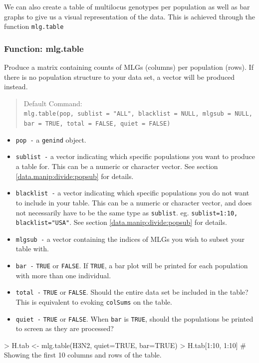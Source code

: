 \documentclass[letterpaper]{article}
\newcommand{\tab}{\hspace*{1em}}
\begin{document}
We can also create a table of multilocus genotypes per population as well as bar graphs to give us a visual representation of the data. This is achieved through the function \texttt{mlg.table}
\subsubsection{Function: mlg.table}\label{mlg:table:mlg.table}

\tab\tab Produce a matrix containing counts of MLGs (columns) per population (rows). If there is no population structure to your data set, a vector will be produced instead.
\begin{quote}
Default Command:\\
\texttt{mlg.table(pop, sublist = "ALL", blacklist = NULL, mlgsub = NULL, bar = TRUE, total = FALSE, quiet = FALSE)}
\end{quote}
  \begin{itemize}
    \item \texttt{pop -} a \texttt{genind} object.
    \item \texttt{sublist -} a vector indicating which specific populations you want to produce a table for. This can be a numeric or character vector. See section \ref{data.manip:divide:popsub} for details.
    \item \texttt{blacklist -} a vector indicating which specific populations you do not want to include in your table. This can be a numeric or character vector, and does not necessarily have to be the same type as \texttt{sublist}. eg. \texttt{sublist=1:10, blacklist="USA"}. See section \ref{data.manip:divide:popsub} for details.
    \item \texttt{mlgsub -} a vector containing the indices of MLGs you wish to subset your table with. 
    \item \texttt{bar -} \texttt{TRUE} or \texttt{FALSE}. If  \texttt{TRUE}, a bar plot will be printed for each population with more than one individual. 
    \item \texttt{total -} \texttt{TRUE} or \texttt{FALSE}. Should the entire data set be included in the table? This is equivalent to evoking \texttt{colSums} on the table.
    \item \texttt{quiet -} \texttt{TRUE} or \texttt{FALSE}. When \texttt{bar} is \texttt{TRUE}, should the populations be printed to screen as they are processed?
  \end{itemize}
\begin{Schunk}
\begin{Sinput}
> H.tab <- mlg.table(H3N2, quiet=TRUE, bar=TRUE)
> H.tab[1:10, 1:10] # Showing the first 10 columns and rows of the table.
\end{Sinput}
\end{Schunk}
\end{document}
